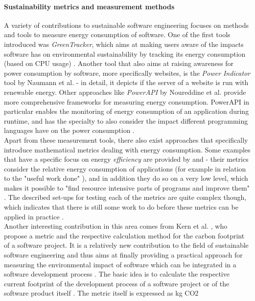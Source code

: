 \documentclass[oribibl]{llncs}
\begin{document}
\paragraph{Sustainability metrics and measurement methods} A variety of contributions to sustainable software engineering focuses on methods and tools to measure energy consumption of software. %
One of the first tools introduced was \textit{GreenTracker}, which aims at making users aware of the impacts software has on environmental sustainability by tracking its energy consumption (based on CPU usage) \cite{amsel_toward_2011}. Another tool that also aims at raising awareness for power consumption by software, more specifically websites, is the \textit{Power Indicator} tool by Naumann et al. \cite{naumann_how_2008} - in detail, it depicts if the server of a website is run with renewable energy. %
Other approaches like \textit{PowerAPI} by Noureddine et al. \cite{noureddine_preliminary_2012} provide more comprehensive frameworks for measuring energy consumption. PowerAPI in particular enables the monitoring of energy consumption of an application during runtime, and has the specialty to also consider the impact different programming languages have on the power consumption \cite{noureddine_preliminary_2012}.\\
Apart from these measurement tools, there also exist approaches that specifically introduce mathematical metrics dealing with energy consumption. %
Some %
examples that have a specific focus on energy \textit{efficiency} are provided by \cite{capra_is_2012} and \cite{johann_how_2012} - their metrics consider the relative energy consumption of applications (for example in relation to the "useful work done" \cite{johann_how_2012}), and in addition they do so on a very low level, which makes it possible to "find resource intensive parts of programs and improve them" \cite{johann_how_2012}. The described set-ups for testing each of the metrics are quite complex though, which indicates that there is still some work to do before these metrics can be applied in practice \cite{johann_how_2012}.\\
Another interesting contribution in this area comes from Kern et al. \cite{kern_impacts_2015}, who propose a metric and the respective calculation method for the carbon footprint of a software project. It is a relatively new contribution to the field of sustainable software engineering and thus aims at finally providing a practical approach for measuring the environmental impact of software which can be integrated in a software development process \cite{kern_impacts_2015}. The basic idea is to calculate the respective current footprint of the development process of a software project or of the software product itself \cite{kern_impacts_2015}. The metric itself is expressed as kg CO2 %
\end{document}
